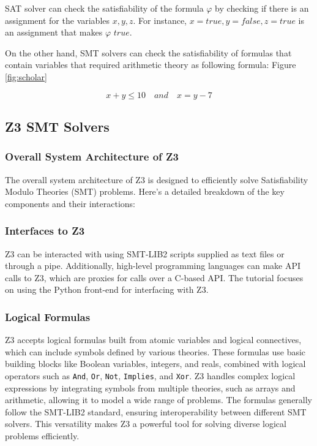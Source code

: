 \documentclass[]{rptuseminar}
\begin{document}
SAT solver can check the satisfiability of the formula \(\varphi\) by checking if there is an assignment for the variables \(x, y, z\).
For instance, \(x = true, y = false, z = true\) is an assignment that makes \(\varphi\) \(true\). 

On the other hand, SMT solvers can check the satisfiability of formulas that contain variables that required arithmetic theory as following formula:
Figure \ref{fig:scholar}

\begin{equation}
  x + y \leq 10 \quad and \quad x = y - 7
\end{equation}

\subsection{Z3 SMT Solvers}
\subsubsection*{Overall System Architecture of Z3}

The overall system architecture of Z3 is designed to efficiently solve Satisfiability Modulo Theories (SMT) problems.
 Here's a detailed breakdown of the key components and their interactions:

\subsubsection{Interfaces to Z3}
Z3 can be interacted with using SMT-LIB2 scripts supplied as text files or through a pipe. Additionally,
high-level programming languages can make API calls to Z3, which are proxies for calls over a C-based API.
The tutorial focuses on using the Python front-end for interfacing with Z3.

\subsubsection{Logical Formulas}
Z3 accepts logical formulas built from atomic variables and logical connectives, which can include symbols defined by various theories.
These formulas use basic building blocks like Boolean variables, integers, and reals, combined with logical operators such as
\texttt{And}, \texttt{Or}, \texttt{Not}, \texttt{Implies}, and \texttt{Xor}. Z3 handles complex logical expressions by
integrating symbols from multiple theories, such as arrays and arithmetic, allowing it to model a wide range of problems.
The formulas generally follow the SMT-LIB2 standard, ensuring interoperability between different SMT solvers. 
This versatility makes Z3 a powerful tool for solving diverse logical problems efficiently.
\end{document}
